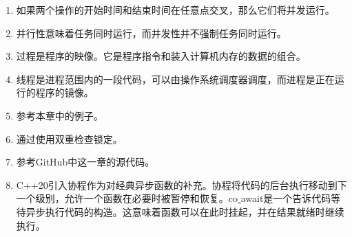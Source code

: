 \begin{enumerate}
	\item 如果两个操作的开始时间和结束时间在任意点交叉，那么它们将并发运行。
	\item 并行性意味着任务同时运行，而并发性并不强制任务同时运行。
	\item 过程是程序的映像。它是程序指令和装入计算机内存的数据的组合。
	\item 线程是进程范围内的一段代码，可以由操作系统调度器调度，而进程是正在运行的程序的镜像。
	\item 参考本章中的例子。
	\item 通过使用双重检查锁定。
	\item 参考GitHub中这一章的源代码。
	\item C++20引入协程作为对经典异步函数的补充。协程将代码的后台执行移动到下一个级别，允许一个函数在必要时被暂停和恢复。co\underline{ }await是一个告诉代码等待异步执行代码的构造。这意味着函数可以在此时挂起，并在结果就绪时继续执行。
\end{enumerate}












